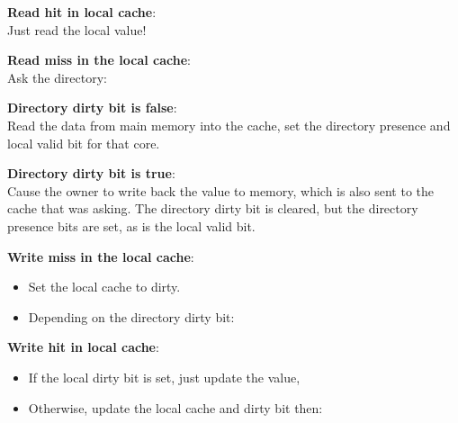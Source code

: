 \begin{description}
  \item \textbf{Read hit in local cache}:\\
    Just read the local value!
  \item \textbf{Read miss in the local cache}:\\
    Ask the directory:
    \begin{description}
      \item \textbf{Directory dirty bit is false}:\\
        Read the data from main memory into the cache, set the directory
        presence and local valid bit for that core.
      \item \textbf{Directory dirty bit is true}:\\
        Cause the owner to write back the value to memory, which is also sent to
        the cache that was asking. The directory dirty bit is cleared, but the
        directory presence bits are set, as is the local valid bit.
    \end{description}
  \item \textbf{Write miss in the local cache}:\\
    \begin{itemize}
      \item Set the local cache to dirty.
      \item Depending on the directory dirty bit:
    \end{itemize}
  \item \textbf{Write hit in local cache}:\\
    \begin{itemize}
      \item If the local dirty bit is set, just update the value,
      \item Otherwise, update the local cache and dirty bit then:

\end{itemize}
\end{description}
